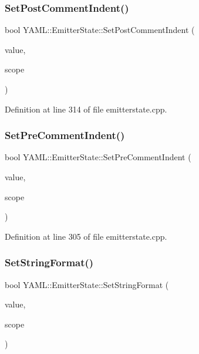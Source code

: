 \subsubsection{\texorpdfstring{SetPostCommentIndent()}{SetPostCommentIndent()}}
{\footnotesize\ttfamily bool Y\+A\+M\+L\+::\+Emitter\+State\+::\+Set\+Post\+Comment\+Indent (\begin{DoxyParamCaption}\item[{std\+::size\+\_\+t}]{value,  }\item[{\mbox{\hyperlink{struct_y_a_m_l_1_1_fmt_scope_a58c967eadfafdc79f62cd5c59ec2b1fe}{Fmt\+Scope\+::value}}}]{scope }\end{DoxyParamCaption})}



Definition at line 314 of file emitterstate.\+cpp.

\mbox{\label{class_y_a_m_l_1_1_emitter_state_a788bafd6b1ffc8a89d7179513f0261fb}} 
\subsubsection{\texorpdfstring{SetPreCommentIndent()}{SetPreCommentIndent()}}
{\footnotesize\ttfamily bool Y\+A\+M\+L\+::\+Emitter\+State\+::\+Set\+Pre\+Comment\+Indent (\begin{DoxyParamCaption}\item[{std\+::size\+\_\+t}]{value,  }\item[{\mbox{\hyperlink{struct_y_a_m_l_1_1_fmt_scope_a58c967eadfafdc79f62cd5c59ec2b1fe}{Fmt\+Scope\+::value}}}]{scope }\end{DoxyParamCaption})}



Definition at line 305 of file emitterstate.\+cpp.

\mbox{\label{class_y_a_m_l_1_1_emitter_state_a18753ce62cfb9d900cc0bc8ea6ee0d38}} 
\subsubsection{\texorpdfstring{SetStringFormat()}{SetStringFormat()}}
{\footnotesize\ttfamily bool Y\+A\+M\+L\+::\+Emitter\+State\+::\+Set\+String\+Format (\begin{DoxyParamCaption}\item[{\mbox{\hyperlink{namespace_y_a_m_l_a67c320aa50d3de7ecba1d0b8775dd684}{E\+M\+I\+T\+T\+E\+R\+\_\+\+M\+A\+N\+IP}}}]{value,  }\item[{\mbox{\hyperlink{struct_y_a_m_l_1_1_fmt_scope_a58c967eadfafdc79f62cd5c59ec2b1fe}{Fmt\+Scope\+::value}}}]{scope }\end{DoxyParamCaption})}



